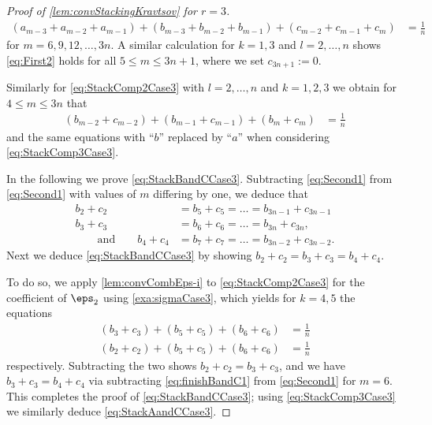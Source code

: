 \begin{proof}[Proof of \cref{lem:convStackingKravtsov} for $r=3$]
 \begin{align}
	(a_{m-3} + a_{m-2} + a_{m-1}) + (b_{m-3} + b_{m-2} + b_{m-1})  + (c_{m-2} + c_{m-1} + c_{m}) &= \frac{1}{n} \label{eq:First2}
		\end{align}
for $m = 6,9,12,\dots, 3n$. A similar calculation for $k=1,3$ and $l=2,\ldots,n$ shows \cref{eq:First2} holds for all $5 \leq m \leq 3n +1$, where we set  $c_{3 n + 1} := 0$.


Similarly for \cref{eq:StackComp2Case3} with $l=2,\ldots,n$ and $k=1,2,3$ we obtain for $4 \leq m \leq 3n$ that
	\begin{align}
	(b_{m-2} + c_{m-2})  + (b_{m-1} + c_{m-1}) + (b_{m} + c_m)  &= \frac{1}{n} \label{eq:Second1} 
	\end{align}
and the same equations with ``$b$'' replaced by ``$a$'' when considering \cref{eq:StackComp3Case3}.

In the following we prove \cref{eq:StackBandCCase3}. Subtracting \eqref{eq:Second1} from \eqref{eq:Second1} with values of $m$ differing by one, we deduce that 
\begin{align*}
	b_{2} + c_2 &= b_5 + c_5 = \ldots = b_{3n-1} + c_{3n-1}\\
	b_3 + c_3 &= b_6 + c_6 = \ldots = b_{3n} + c_{3n}, \\
	\qquad \text{and} \qquad b_4 + c_4 &= b_7 + c_7 = \ldots = b_{3n-2} + c_{3n-2}.
	\end{align*}
Next we deduce \cref{eq:StackBandCCase3} by showing $b_2 + c_2 = b_3 + c_3 = b_4 + c_4$. 

To do so, we apply  \cref{lem:convCombEps-i} to \eqref{eq:StackComp2Case3} for the coefficient of $\eps_2$ using \cref{exa:sigmaCase3}, which yields for $k=4,5$ the equations
	\begin{align}
	(b_3 + c_3) + (b_5 + c_5) + (b_6 + c_6)  &= \frac{1}{n}  \label{eq:finishBandC1}\\
	(b_2 + c_2) + (b_5 + c_5) + (b_6  + c_6)  &= \frac{1}{n} \label{eq:finishBandC2}
	\end{align}
respectively. Subtracting the two shows $b_2 + c_2  = b_3 + c_3$, and we have $b_3 + c_3  = b_4 + c_4$ via subtracting \eqref{eq:finishBandC1} from \eqref{eq:Second1} for $m=6$. This completes the proof of \cref{eq:StackBandCCase3}; using \cref{eq:StackComp3Case3} we similarly deduce \cref{eq:StackAandCCase3}.


\end{proof}
